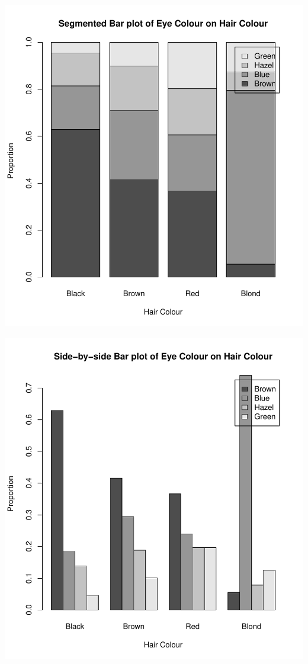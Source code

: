 \documentclass[
]{book}
\begin{document}
\includegraphics{_main_files/figure-latex/unnamed-chunk-12-1.pdf}

\includegraphics{_main_files/figure-latex/unnamed-chunk-13-1.pdf}
\end{document}
